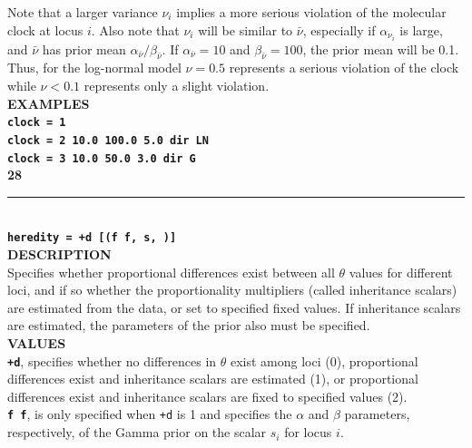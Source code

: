 \documentclass[a4paper]{book}
\numberwithin{equation}{section} \renewcommand{\baselinestretch}{0.55}
\begin{document}
Note that a larger variance $\nu_i$ implies a more serious violation
of the molecular clock at locus $i$.  Also note that $\nu_i$ will be
similar to $\bar\nu$, especially if $\alpha_{\nu_i}$ is large, and
$\bar\nu$ has prior mean $\alpha_{\bar{\nu}} / \beta_{\bar{\nu}}$.  If
$\alpha_{\bar{\nu}} = 10$ and $\beta_{\bar{\nu}} = 100$, the prior
mean will be 0.1. Thus, for the log-normal model $\nu = 0.5$
represents a serious violation of the clock while $\nu < 0.1$ represents only a slight violation. \vspace{5pt}\\
\textbf{EXAMPLES} \vspace{5pt}\\
\textbf{\texttt{clock = 1}} \vspace{5pt}\\
\textbf{\texttt{clock = 2 10.0 100.0 5.0 dir LN}}\vspace{5pt}\\
\textbf{\texttt{clock = 3 10.0 50.0 3.0 dir G}}\vspace{10pt}\\
\textbf{{\large 28}} \\
\noindent\rule{\textwidth}{0.8pt} \\
\textbf{{\Large \texttt{heredity = +d [(f f, s, )]}}} \vspace{5pt}\\
\textbf{DESCRIPTION} \vspace{5pt}\\
Specifies whether proportional differences exist between all $\theta$
values for different loci, and if so whether the proportionality
multipliers (called inheritance scalars) are estimated from the data,
or set to specified fixed values. If inheritance scalars are
estimated, the parameters of the prior also must be specified.
\vspace{5pt}\\
\textbf{VALUES} \vspace{5pt}\\
\textbf{\texttt{+d}}, specifies whether no differences in $\theta$
exist among loci (0), proportional differences exist and inheritance
scalars are estimated (1), or proportional
differences exist and inheritance scalars are fixed to specified values (2). \vspace{5pt}\\
\textbf{\texttt{f f}}, is only specified when \texttt{+d} is 1 and
specifies the $\alpha$ and
$\beta$ parameters, respectively, of the Gamma prior on the scalar $s_i$ for locus $i$. \vspace{5pt}\\
\end{document}
